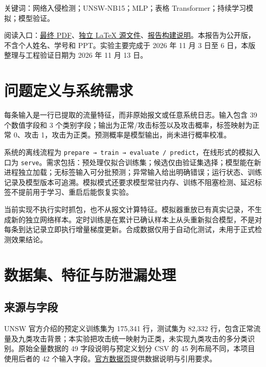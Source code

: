 \documentclass[UTF8,a4paper,11pt,fontset=fandol]{ctexart}
\begin{document}
关键词：网络入侵检测；UNSW-NB15；MLP；表格
Transformer；持续学习模拟；模型验证。

阅读入口：\href{https://github.com/ZureTz/ml-network-intrusion-detection/blob/master/reports/final/report.pdf}{最终
PDF}、\href{https://github.com/ZureTz/ml-network-intrusion-detection/blob/master/reports/final/report.tex}{独立
LaTeX
源文件}、\href{https://github.com/ZureTz/ml-network-intrusion-detection/blob/master/reports/final/README.md}{报告构建说明}。本报告为公开版，不含个人姓名、学号和
PPT。实验主要完成于 2026 年 11 月 3 日至 6 日，本版整理与工程验证日期为
2026 年 11 月 13 日。

\section{问题定义与系统需求}\label{ux95eeux9898ux5b9aux4e49ux4e0eux7cfbux7edfux9700ux6c42}

每条输入是一行已提取的流量特征，而非原始报文或任意系统日志。输入包含 39
个数值字段和 3
个类别字段；输出为正常/攻击标签以及攻击概率，标签映射为正常 0、攻击
1，攻击为正类。预测概率是模型输出，尚未进行概率校准。

系统的离线流程为
\texttt{prepare\ →\ train\ →\ evaluate\ /\ predict}，在线形式的模拟入口为
\texttt{serve}。需求包括：预处理仅拟合训练集；候选仅由验证集选择；模型能在新进程独立加载；无标签输入可分批预测；异常输入给出明确错误；运行状态、训练记录及模型版本可追溯。模拟模式还要求模型常驻内存、训练不阻塞检测、延迟标签不提前用于学习、重启后能恢复实验。

当前实现不执行实时抓包，也不从报文计算特征。模拟器重放已有真实记录，不生成新的独立网络样本。定时训练是在累计已确认样本上从头重新拟合模型，不是对每条到达记录立即执行增量梯度更新。合成数据仅用于自动化测试，未用于正式检测效果结论。

\section{数据集、特征与防泄漏处理}\label{ux6570ux636eux96c6ux7279ux5f81ux4e0eux9632ux6cc4ux6f0fux5904ux7406}

\subsection{来源与字段}\label{ux6765ux6e90ux4e0eux5b57ux6bb5}

UNSW 官方介绍的预定义训练集为 175,341 行，测试集为 82,332
行，包含正常流量及九类攻击背景；本实验把攻击统一映射为正类，未实现九类攻击的多分类识别。原始全量数据的
49 字段说明与预定义划分 CSV 的 45 列布局不同，本项目使用后者的 42
个输入字段。\href{https://research.unsw.edu.au/projects/unsw-nb15-dataset}{官方数据页}提供数据说明与引用要求。
\end{document}
